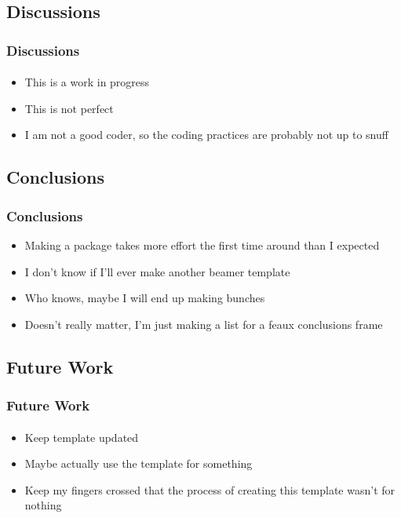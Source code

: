 \documentclass[compress, xcolor = svgnames, t]{beamer}
\begin{document}

\subsection{Discussions} %
\label{sub:discussions}

\begin{frame}\frametitle{Discussions}\framesubtitle{}
	\begin{itemize}
		\item This is a work in progress
		\item This is not perfect
		\item I am not a good coder, so the coding practices are probably not up to snuff
	\end{itemize}
\end{frame}


\subsection{Conclusions} %
\label{sub:conclusions}

\begin{frame}\frametitle{Conclusions}
\begin{itemize}
	\item Making a package takes more effort the first time around than I expected
	\item I don't know if I'll ever make another beamer template
	\item Who knows, maybe I will end up making bunches
	\item Doesn't really matter, I'm just making a list for a feaux conclusions frame
\end{itemize}
\end{frame}


\subsection{Future Work} %
\label{sub:future_work}

\begin{frame}\frametitle{Future Work}\framesubtitle{}
	\begin{itemize}
		\item Keep template updated
		\item Maybe actually use the template for something
		\item Keep my fingers crossed that the process of creating this template wasn't for nothing
	\end{itemize}
\end{frame}


\end{document}
